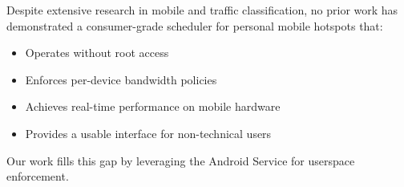 Despite extensive research in mobile \qos and traffic classification, no prior work has demonstrated a consumer-grade \qos scheduler for personal mobile hotspots that:
\begin{itemize}
    \item Operates without root access
    \item Enforces per-device bandwidth policies
    \item Achieves real-time performance on mobile hardware
    \item Provides a usable interface for non-technical users
\end{itemize}

Our work fills this gap by leveraging the Android \vpn Service \api for userspace \qos enforcement.
